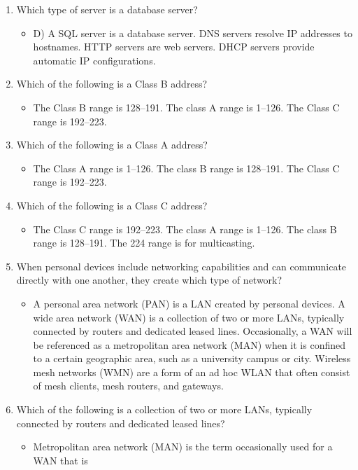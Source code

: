 \documentclass{article}
\begin{document}
\begin{enumerate}
    \item Which type of server is a database server?
     \begin{itemize}
        \item D) A SQL server is a database server. DNS servers resolve IP addresses to hostnames.
HTTP servers are web servers. DHCP servers provide automatic IP configurations.
    \end{itemize}
    \item Which of the following is a Class B address?
     \begin{itemize}
        \item The Class B range is 128–191. The class A range is 1–126. The Class C range is 192–223.
    \end{itemize}
    \item Which of the following is a Class A address?
     \begin{itemize}
        \item The Class A range is 1–126. The class B range is 128–191. The Class C range is 192–223.
    \end{itemize}
    \item Which of the following is a Class C address?
     \begin{itemize}
        \item The Class C range is 192–223. The class A range is 1–126. The class B range is 128–191.
The 224 range is for multicasting.
    \end{itemize}
    \item When personal devices include networking capabilities and can communicate directly with
one another, they create which type of network?
     \begin{itemize}
        \item A personal area network (PAN) is a LAN created by personal devices. A wide area
network (WAN) is a collection of two or more LANs, typically connected by routers and
dedicated leased lines. Occasionally, a WAN will be referenced as a metropolitan area
network (MAN) when it is confined to a certain geographic area, such as a university
campus or city. Wireless mesh networks (WMN) are a form of an ad hoc WLAN that often
consist of mesh clients, mesh routers, and gateways.
    \end{itemize}
    \item Which of the following is a collection of two or more LANs, typically connected by routers
and dedicated leased lines?
     \begin{itemize}
        \item Metropolitan area network (MAN) is the term occasionally used for a WAN that is

\end{itemize}
\end{enumerate}
\end{document}
